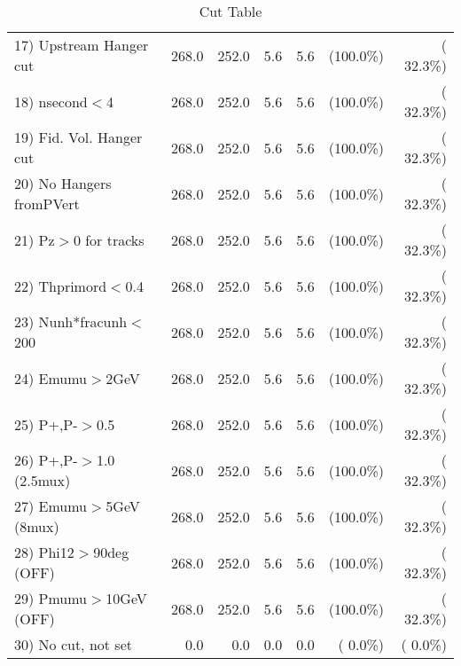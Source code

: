 \begin{table}[h!]
\begin{tabular}{||l||r|r|r|r|r|r||}
 17) Upstream Hanger cut  &        268.0 &        252.0 &          5.6 &          5.6 & (100.0\%) & ( 32.3\%) \\
 18) nsecond$<$4          &        268.0 &        252.0 &          5.6 &          5.6 & (100.0\%) & ( 32.3\%) \\
 19) Fid. Vol. Hanger cut &        268.0 &        252.0 &          5.6 &          5.6 & (100.0\%) & ( 32.3\%) \\
 20) No Hangers fromPVert &        268.0 &        252.0 &          5.6 &          5.6 & (100.0\%) & ( 32.3\%) \\
 21) Pz$>$0 for tracks    &        268.0 &        252.0 &          5.6 &          5.6 & (100.0\%) & ( 32.3\%) \\
 22) Thprimord$<$0.4      &        268.0 &        252.0 &          5.6 &          5.6 & (100.0\%) & ( 32.3\%) \\
 23) Nunh*fracunh$<$200   &        268.0 &        252.0 &          5.6 &          5.6 & (100.0\%) & ( 32.3\%) \\
 24) Emumu$>$2GeV         &        268.0 &        252.0 &          5.6 &          5.6 & (100.0\%) & ( 32.3\%) \\
 25) P+,P-$>$0.5          &        268.0 &        252.0 &          5.6 &          5.6 & (100.0\%) & ( 32.3\%) \\
 26) P+,P-$>$1.0 (2.5mux) &        268.0 &        252.0 &          5.6 &          5.6 & (100.0\%) & ( 32.3\%) \\
 27) Emumu$>$5GeV  (8mux) &        268.0 &        252.0 &          5.6 &          5.6 & (100.0\%) & ( 32.3\%) \\
 28) Phi12$>$90deg  (OFF) &        268.0 &        252.0 &          5.6 &          5.6 & (100.0\%) & ( 32.3\%) \\
 29) Pmumu$>$10GeV  (OFF) &        268.0 &        252.0 &          5.6 &          5.6 & (100.0\%) & ( 32.3\%) \\
 30) No cut, not set      &          0.0 &          0.0 &          0.0 &          0.0 & (  0.0\%) & (  0.0\%) \\
 \hline
 \hline
 \end{tabular}
 \caption{Cut Table           }
 \label{tab-cutheavy_neutrino_4.000}
 \end{table}
